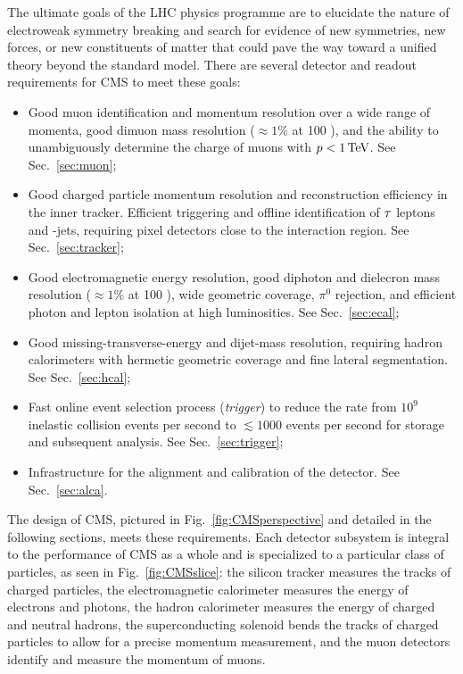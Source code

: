 The ultimate goals of the LHC physics programme are to elucidate the nature of
electroweak symmetry breaking and search for evidence of new symmetries, new
forces, or new constituents of matter that could pave the way toward a
unified theory beyond the standard model. There are several detector
and readout requirements for CMS to meet these goals:
\begin{itemize}
\item Good muon identification and momentum resolution over a wide
  range of momenta, good dimuon mass resolution ($\approx 1\%$ at 100
  \GeV), and the ability to unambiguously determine the charge of muons
  with $p<1 \,\text{Te\hspace{-.08em}V}$. See Sec.~\ref{sec:muon};
\item Good charged particle momentum resolution and reconstruction
efficiency in the inner tracker. Efficient triggering and offline
identification of $\tau$ leptons and \PQb-jets, requiring pixel
detectors close to the interaction region. See Sec.~\ref{sec:tracker};
\item Good electromagnetic energy resolution, good diphoton and
  dielecron mass resolution ($\approx 1\%$ at 100 \GeV), wide
  geometric coverage, $\pi^0$ rejection, and efficient photon and
  lepton isolation at high luminosities. See Sec.~\ref{sec:ecal};
\item Good missing-transverse-energy and dijet-mass resolution,
  requiring hadron calorimeters with hermetic geometric coverage and
  fine lateral segmentation. See Sec.~\ref{sec:hcal};
\item Fast online event selection process (\emph{trigger}) to reduce the rate from $10^9$ inelastic collision
  events per second to $\lesssim1000$ events per second for storage
  and subsequent analysis. See Sec.~\ref{sec:trigger};
\item Infrastructure for the alignment and calibration of the detector. See Sec.~\ref{sec:alca}.
\end{itemize}
The design of CMS, pictured in Fig.~\ref{fig:CMSperspective} and detailed
in the following sections, meets these requirements. Each detector subsystem is
integral to the performance of CMS as a whole and is specialized to a
particular class of particles, as seen in Fig.~\ref{fig:CMSslice}: the silicon
tracker measures the tracks of charged particles, the electromagnetic
calorimeter measures the energy of electrons and photons, the hadron calorimeter measures the
energy of charged and neutral hadrons, the
superconducting solenoid bends the tracks of charged particles to
allow for a precise momentum measurement, and the muon detectors
identify and measure the momentum of muons.

